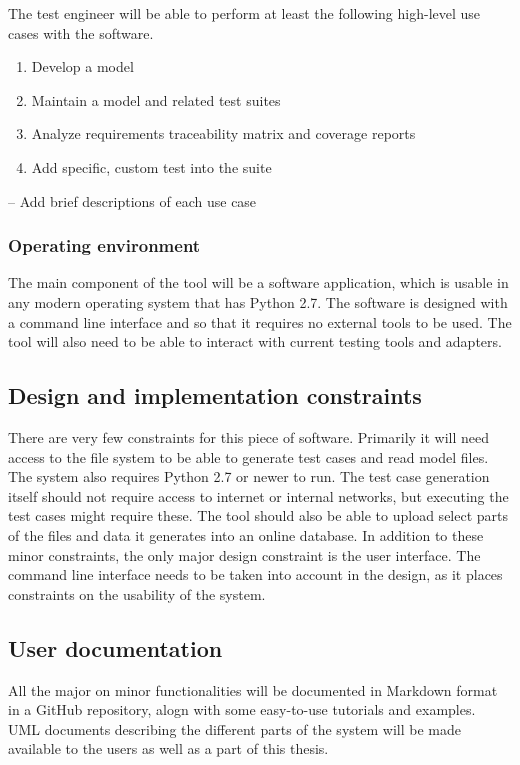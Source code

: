The test engineer will be able to perform at least the following high-level use cases with the software. 

\begin{enumerate}
	\item Develop a model
	\item Maintain a model and related test suites
	\item Analyze requirements traceability matrix and coverage reports
	\item Add specific, custom test into the suite
\end{enumerate}  

-- Add brief descriptions of each use case

\subsubsection{Operating environment}
The main component of the tool will be a software application, which is usable in any modern operating system that has Python 2.7. The software is designed with a command line interface and so that it requires no external tools to be used. The tool will also need to be able to interact with current testing tools and adapters. 

\subsection{Design and implementation constraints}
There are very few constraints for this piece of software. Primarily it will need access to the file system to be able to generate test cases and read model files. The system also requires Python 2.7 or newer to run. The test case generation itself should not require access to internet or internal networks, but executing the test cases might require these. The tool should also be able to upload select parts of the files and data it generates into an online database. In addition to these minor constraints, the only major design constraint is the user interface. The command line interface needs to be taken into account in the design, as it places constraints on the usability of the system.

\subsection{User documentation}
All the major on minor functionalities will be documented in Markdown format in a GitHub repository, alogn with some easy-to-use tutorials and examples. UML documents describing the different parts of the system will be made available to the users as well as a part of this thesis.  


